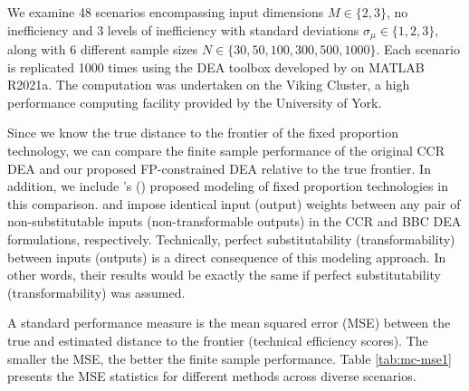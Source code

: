 {We examine 48 scenarios encompassing input dimensions $M \in \{2, 3\}$, no inefficiency and 3 levels of inefficiency with standard deviations $\sigma_\mu \in \{1, 2, 3\}$, along with 6 different sample sizes $N \in \{30, 50, 100, 300, 500, 1000\}$. Each scenario is replicated 1000 times using the DEA toolbox developed by \textcite{alvarez_data_2020} on MATLAB R2021a. The computation was undertaken on the Viking Cluster, a high performance computing facility provided by the University of York. 

Since we know the true distance to the frontier of the fixed proportion technology, we can compare the finite sample performance of the original CCR DEA and our proposed FP-constrained DEA relative to the true frontier. In addition, we include \citeauthor{Barnum2011}'s (\citeyear{Barnum2011}) proposed modeling of fixed proportion technologies in this comparison. \textcite{Barnum2011} and \textcite{Barnum2017} impose identical input (output) weights between any pair of non-substitutable inputs (non-transformable outputs) in the CCR and BBC DEA formulations, respectively. Technically, perfect substitutability (transformability) between inputs (outputs) is a direct consequence of this modeling approach. In other words, their results would be exactly the same if perfect substitutability (transformability) was assumed. 

A standard performance measure is the mean squared error (MSE) between the true and estimated distance to the frontier (technical efficiency scores). The smaller the MSE, the better the finite sample performance. Table \ref{tab:mc-mse1} presents the MSE statistics for different methods across diverse scenarios. 

}
